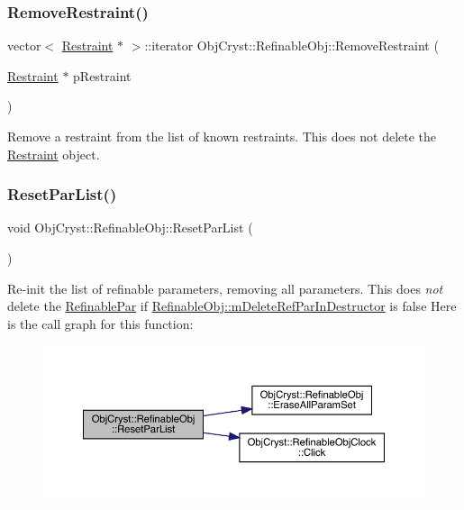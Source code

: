 \subsubsection{\texorpdfstring{RemoveRestraint()}{RemoveRestraint()}}
{\footnotesize\ttfamily vector$<$ \mbox{\hyperlink{class_obj_cryst_1_1_restraint}{Restraint}} $\ast$ $>$\+::iterator Obj\+Cryst\+::\+Refinable\+Obj\+::\+Remove\+Restraint (\begin{DoxyParamCaption}\item[{\mbox{\hyperlink{class_obj_cryst_1_1_restraint}{Restraint}} $\ast$}]{p\+Restraint }\end{DoxyParamCaption})}

Remove a restraint from the list of known restraints. This does not delete the \mbox{\hyperlink{class_obj_cryst_1_1_restraint}{Restraint}} object. \mbox{\label{class_obj_cryst_1_1_refinable_obj_a3b6228c6fbd154441d935af2d511fe82}} 
\subsubsection{\texorpdfstring{ResetParList()}{ResetParList()}}
{\footnotesize\ttfamily void Obj\+Cryst\+::\+Refinable\+Obj\+::\+Reset\+Par\+List (\begin{DoxyParamCaption}{ }\end{DoxyParamCaption})}

Re-\/init the list of refinable parameters, removing all parameters. This does {\itshape not} delete the \mbox{\hyperlink{class_obj_cryst_1_1_refinable_par}{Refinable\+Par}} if \mbox{\hyperlink{class_obj_cryst_1_1_refinable_obj_a8e3295302c9a1f9ea29f1749132e561b}{Refinable\+Obj\+::m\+Delete\+Ref\+Par\+In\+Destructor}} is false Here is the call graph for this function\+:
\nopagebreak
\begin{figure}[H]
\begin{center}
\leavevmode
\includegraphics[width=350pt]{class_obj_cryst_1_1_refinable_obj_a3b6228c6fbd154441d935af2d511fe82_cgraph}
\end{center}
\end{figure}
\mbox{\label{class_obj_cryst_1_1_refinable_obj_a057437fe6759b589906d8a16f9732e22}} 
